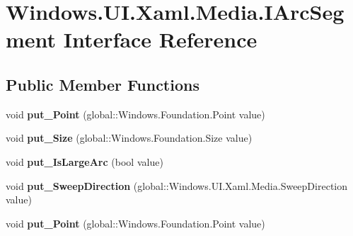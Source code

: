 \hypertarget{interface_windows_1_1_u_i_1_1_xaml_1_1_media_1_1_i_arc_segment}{}\section{Windows.\+U\+I.\+Xaml.\+Media.\+I\+Arc\+Segment Interface Reference}
\label{interface_windows_1_1_u_i_1_1_xaml_1_1_media_1_1_i_arc_segment}
\subsection*{Public Member Functions}
\begin{DoxyCompactItemize}
\item 
\mbox{\label{interface_windows_1_1_u_i_1_1_xaml_1_1_media_1_1_i_arc_segment_aa012b7d8361f03f19e160daaac966cb2}} 
void {\bfseries put\+\_\+\+Point} (global\+::\+Windows.\+Foundation.\+Point value)
\item 
\mbox{\label{interface_windows_1_1_u_i_1_1_xaml_1_1_media_1_1_i_arc_segment_a38665026a67cd69927958162dd6dc109}} 
void {\bfseries put\+\_\+\+Size} (global\+::\+Windows.\+Foundation.\+Size value)
\item 
\mbox{\label{interface_windows_1_1_u_i_1_1_xaml_1_1_media_1_1_i_arc_segment_ae090da4e0e10d6c6fba41eb81f4e56f4}} 
void {\bfseries put\+\_\+\+Is\+Large\+Arc} (bool value)
\item 
\mbox{\label{interface_windows_1_1_u_i_1_1_xaml_1_1_media_1_1_i_arc_segment_aa5c0f05483cfe843d18d35db2877ad20}} 
void {\bfseries put\+\_\+\+Sweep\+Direction} (global\+::\+Windows.\+U\+I.\+Xaml.\+Media.\+Sweep\+Direction value)
\item 
\mbox{\label{interface_windows_1_1_u_i_1_1_xaml_1_1_media_1_1_i_arc_segment_aa012b7d8361f03f19e160daaac966cb2}} 
void {\bfseries put\+\_\+\+Point} (global\+::\+Windows.\+Foundation.\+Point value)
\item 
\mbox{\label{interface_windows_1_1_u_i_1_1_xaml_1_1_media_1_1_i_arc_segment_a38665026a67cd69927958162dd6dc109}} 

\end{DoxyCompactItemize}
